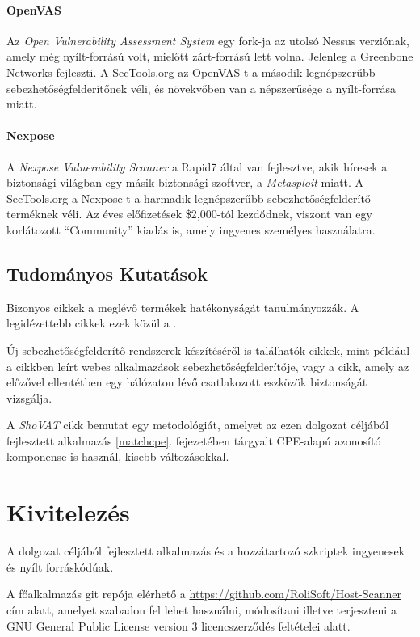 	\paragraph*{OpenVAS} Az \textit{Open Vulnerability Assessment System}\cite{openvas} egy fork-ja az utolsó Nessus verziónak, amely még nyílt-forrású volt, mielőtt zárt-forrású lett volna. Jelenleg a Greenbone Networks fejleszti. A SecTools.org az OpenVAS-t a második legnépszerűbb sebezhetőségfelderítőnek véli, és növekvőben van a népszerűsége a nyílt-forrása miatt.
	
	\paragraph*{Nexpose} A \textit{Nexpose Vulnerability Scanner}\cite{nexpose} a Rapid7 által van fejlesztve, akik híresek a biztonsági világban egy másik biztonsági szoftver, a \textit{Metasploit} miatt. A SecTools.org a Nexpose-t a harmadik legnépszerűbb sebezhetőségfelderítő terméknek véli. Az éves előfizetések \$2,000-tól kezdődnek, viszont van egy korlátozott ``Community'' kiadás is, amely ingyenes személyes használatra.
	
\subsection*{Tudományos Kutatások}
	
	Bizonyos cikkek a meglévő termékek hatékonyságát tanulmányozzák. A legidézettebb cikkek ezek közül a \cite{holm11,bau10,doupe10}.
	
	Új sebezhetőségfelderítő rendszerek készítéséről is találhatók cikkek, mint például a \cite{kals06} cikkben leírt webes alkalmazások sebezhetőségfelderítője, vagy a \cite{guo05} cikk, amely az előzővel ellentétben egy hálózaton lévő csatlakozott eszközök biztonságát vizsgálja.
	
	A \textit{ShoVAT}\cite{shovat15} cikk bemutat egy metodológiát, amelyet az ezen dolgozat céljából fejlesztett alkalmazás \ref{matchcpe}. fejezetében tárgyalt CPE-alapú azonosító komponense is használ, kisebb változásokkal.

\section*{Kivitelezés}

	A dolgozat céljából fejlesztett alkalmazás és a hozzátartozó szkriptek ingyenesek és nyílt forráskódúak.

	A főalkalmazás git repója elérhető a \url{https://github.com/RoliSoft/Host-Scanner} cím alatt, amelyet szabadon fel lehet használni, módosítani illetve terjeszteni a GNU General Public License version 3\cite{gplv3} licencszerződés feltételei alatt.
	
